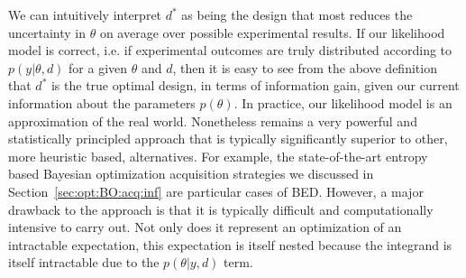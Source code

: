 We can intuitively interpret $d^*$ as being the design that most reduces the uncertainty in $\theta$
on average over possible experimental results.  If our likelihood model is correct, i.e. if experimental outcomes
are truly distributed according to $p(y | \theta, d)$ for a given $\theta$ and $d$, then it is easy to see 		
from the above definition that		
$d^*$ is the true optimal design, in terms of information gain, given our current information about		
the parameters $p\left(\theta \right)$.  		
In practice, our likelihood model is an approximation of		
the real world.
Nonetheless \Bad remains a very powerful and
statistically principled approach that is typically significantly superior to other, more heuristic based,
alternatives.  For example, the state-of-the-art entropy based Bayesian optimization acquisition strategies we 
discussed in Section~\ref{sec:opt:BO:acq:inf} are particular cases of BED.
However, a major drawback to the \Bad
approach is that it is typically difficult and computationally intensive to carry out.  
Not only does it represent an optimization 
of an intractable expectation, this expectation is itself nested because
the integrand is itself intractable due to the $p\left(\theta | y, d\right)$ term.